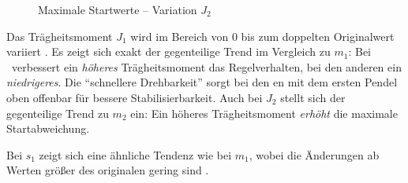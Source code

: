 \begin{figure}
	\caption{Maximale Startwerte -- Variation $J_2$}
	\label{fig:sysvarJ2}
\end{figure}

Das Trägheitsmoment $J_1$ wird im Bereich von 0 bis zum doppelten Originalwert variiert .
Es zeigt sich exakt der gegenteilige Trend im Vergleich zu $m_1$: Bei \apz\ verbessert ein \emph{höheres} Trägheitsmoment das Regelverhalten, bei den anderen ein \emph{niedrigeres}.
Die "`schnellere Drehbarkeit"' sorgt bei den \ap en mit dem ersten Pendel oben offenbar für bessere Stabilisierbarkeit.
Auch bei $J_2$ stellt sich der gegenteilige Trend zu $m_2$ ein: Ein höheres Trägheitsmoment \emph{erhöht} die maximale Startabweichung.

Bei $s_1$ zeigt sich eine ähnliche Tendenz wie bei $m_1$, wobei die Änderungen ab Werten größer des originalen gering sind .

